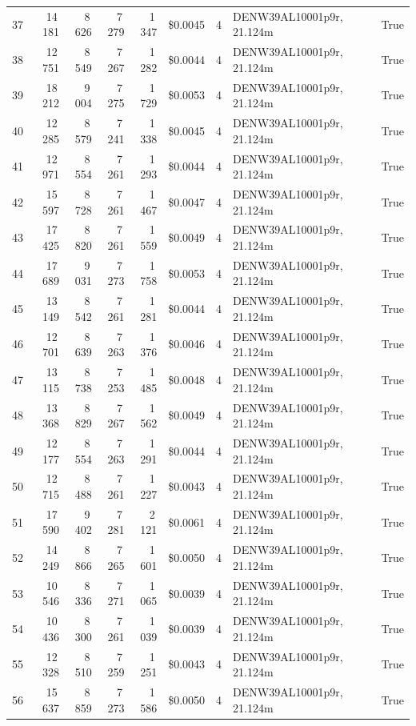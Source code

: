 \documentclass[a4paper,11pt]{article}
\begin{document}
\begin{table}[ht]
\begin{tabular}{r r r r r r r p{3cm} l}
37 & 14\,181 & 8\,626 & 7\,279 & 1\,347 & \$0.0045 & 4 & DENW39AL10001p9r, 21.124m & True \\
38 & 12\,751 & 8\,549 & 7\,267 & 1\,282 & \$0.0044 & 4 & DENW39AL10001p9r, 21.124m & True \\
39 & 18\,212 & 9\,004 & 7\,275 & 1\,729 & \$0.0053 & 4 & DENW39AL10001p9r, 21.124m & True \\
40 & 12\,285 & 8\,579 & 7\,241 & 1\,338 & \$0.0045 & 4 & DENW39AL10001p9r, 21.124m & True \\
41 & 12\,971 & 8\,554 & 7\,261 & 1\,293 & \$0.0044 & 4 & DENW39AL10001p9r, 21.124m & True \\
42 & 15\,597 & 8\,728 & 7\,261 & 1\,467 & \$0.0047 & 4 & DENW39AL10001p9r, 21.124m & True \\
43 & 17\,425 & 8\,820 & 7\,261 & 1\,559 & \$0.0049 & 4 & DENW39AL10001p9r, 21.124m & True \\
44 & 17\,689 & 9\,031 & 7\,273 & 1\,758 & \$0.0053 & 4 & DENW39AL10001p9r, 21.124m & True \\
45 & 13\,149 & 8\,542 & 7\,261 & 1\,281 & \$0.0044 & 4 & DENW39AL10001p9r, 21.124m & True \\
46 & 12\,701 & 8\,639 & 7\,263 & 1\,376 & \$0.0046 & 4 & DENW39AL10001p9r, 21.124m & True \\
47 & 13\,115 & 8\,738 & 7\,253 & 1\,485 & \$0.0048 & 4 & DENW39AL10001p9r, 21.124m & True \\
48 & 13\,368 & 8\,829 & 7\,267 & 1\,562 & \$0.0049 & 4 & DENW39AL10001p9r, 21.124m & True \\
49 & 12\,177 & 8\,554 & 7\,263 & 1\,291 & \$0.0044 & 4 & DENW39AL10001p9r, 21.124m & True \\
50 & 12\,715 & 8\,488 & 7\,261 & 1\,227 & \$0.0043 & 4 & DENW39AL10001p9r, 21.124m & True \\
51 & 17\,590 & 9\,402 & 7\,281 & 2\,121 & \$0.0061 & 4 & DENW39AL10001p9r, 21.124m & True \\
52 & 14\,249 & 8\,866 & 7\,265 & 1\,601 & \$0.0050 & 4 & DENW39AL10001p9r, 21.124m & True \\
53 & 10\,546 & 8\,336 & 7\,271 & 1\,065 & \$0.0039 & 4 & DENW39AL10001p9r, 21.124m & True \\
54 & 10\,436 & 8\,300 & 7\,261 & 1\,039 & \$0.0039 & 4 & DENW39AL10001p9r, 21.124m & True \\
55 & 12\,328 & 8\,510 & 7\,259 & 1\,251 & \$0.0043 & 4 & DENW39AL10001p9r, 21.124m & True \\
56 & 15\,637 & 8\,859 & 7\,273 & 1\,586 & \$0.0050 & 4 & DENW39AL10001p9r, 21.124m & True \\

\end{tabular}
\end{table}
\end{document}
